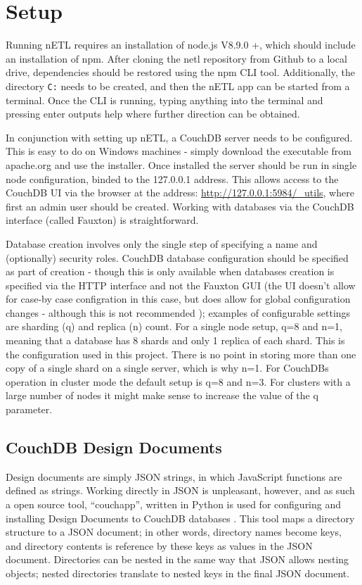 \section{Setup}
Running nETL requires an installation of node.js V8.9.0 +, which should include an installation of npm. After cloning the netl repository from Github to a local drive, dependencies should be restored using the npm CLI tool. Additionally, the directory \texttt{C:\log} needs to be created, and then the nETL app can be started from a terminal. Once the CLI is running, typing anything into the terminal and pressing enter outputs help where further direction can be obtained.

In conjunction with setting up nETL, a CouchDB server needs to be configured. This is easy to do on Windows machines - simply download the executable from apache.org and use the installer. Once installed the server should be run in single node configuration, binded to the 127.0.0.1 address. This allows access to the CouchDB UI via the browser at the address: \url{http://127.0.0.1:5984/\_utils}, where first an admin user should be created. Working with databases via the CouchDB interface (called Fauxton) is straightforward.

Database creation involves only the single step of specifying a name and (optionally) security roles. CouchDB database configuration should be specified as part of creation - though this is only available when databases creation is specified via the HTTP interface and not the Fauxton GUI (the UI doesn't allow for case-by case configration in this case, but does allow for global configuration changes - although this is not recommended \cite{fauxton}); examples of configurable settings are sharding (q) and replica (n) count. For a single node setup, q=8 and n=1, meaning that a database has 8 shards and only 1 replica of each shard. This is the configuration used in this project. There is no point in storing more than one copy of a single shard on a single server, which is why n=1. For CouchDBs operation in cluster mode the default setup is q=8 and n=3. For clusters with a large number of nodes it might make sense to increase the value of the q parameter.

\subsection{CouchDB Design Documents}
Design documents are simply JSON strings, in which JavaScript functions are defined as strings. Working directly in JSON is unpleasant, however, and as such a open source tool, ``couchapp'', written in Python is used for configuring and installing Design Documents to CouchDB databases \cite{pythonCouchapp}. This tool maps a directory structure to a JSON document; in other words, directory names become keys, and directory contents is reference by these keys as values in the JSON document. Directories can be nested in the same way that JSON allows nesting objects; nested directories translate to nested keys in the final JSON document.

